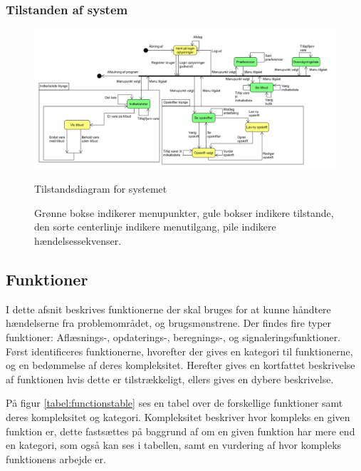 

\subsubsection*{Tilstanden af system}
\begin{figure}
	\centering
	\includegraphics[scale=0.6, angle=90]{images/Diagrams/Tilstandsdiagram.PNG}
	\caption{Tilstandsdiagram for systemet}
	\caption{Grønne bokse indikerer menupunkter, gule bokser indikere tilstande, den sorte centerlinje indikere menutilgang, pile indikere hændelsessekvenser.}\label{tilstandsdiagram}
\end{figure}



\subsection{Funktioner}\label{subsec:funktioner}

I dette afsnit beskrives funktionerne der skal bruges for at kunne håndtere hændelserne fra problemområdet, og brugsmønstrene.
Der findes fire typer funktioner: Aflæsnings-, opdaterings-, beregnings-, og signaleringsfunktioner.\citep{OOA&D2001}
Først identificeres funktionerne, hvorefter der gives en kategori til funktionerne, og en bedømmelse af deres kompleksitet. Herefter gives en kortfattet beskrivelse af funktionen hvis dette er tilstrækkeligt, ellers gives en dybere beskrivelse.

På figur \ref{tabel:functionstable} ses en tabel over de forskellige funktioner samt deres kompleksitet og kategori.
Kompleksitet beskriver hvor kompleks en given funktion er, dette fastsættes på baggrund af om en given funktion har mere end en kategori, som også kan ses i tabellen, samt en vurdering af hvor kompleks funktionens arbejde er.

